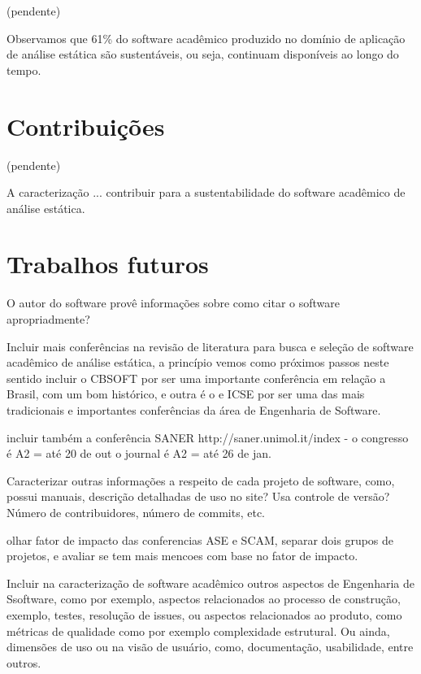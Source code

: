 \label{conclusoes}

(pendente)

Observamos que 61\% do software acadêmico produzido no domínio de aplicação de
análise estática são sustentáveis, ou seja, continuam disponíveis ao longo do
tempo.

\section{Contribuições}

(pendente)

A caracterização ... contribuir para a sustentabilidade do software acadêmico
de análise estática.

\section{Trabalhos futuros}

O autor do software provê informações sobre como citar o software apropriadmente? \cite{allen2017engineering}

Incluir mais conferências na revisão de literatura para busca e seleção de
software acadêmico de análise estática, a princípio vemos como próximos passos
neste sentido incluir o CBSOFT por ser uma importante conferência em relação a
Brasil, com um bom histórico, e outra é o e ICSE por ser uma das mais
tradicionais e importantes conferências da área de Engenharia de Software.

incluir também a conferência SANER http://saner.unimol.it/index -
 o congresso é A2 = até 20 de out
 o journal é A2 = até 26 de jan.

Caracterizar outras informações a respeito de cada projeto de software, como,
possui manuais, descrição detalhadas de uso no site? Usa controle de versão?
Número de contribuidores, número de commits, etc.

olhar fator de impacto das conferencias ASE e SCAM, separar dois grupos de
projetos, e avaliar se tem mais mencoes com base no fator de impacto.

Incluir na caracterização de software acadêmico outros aspectos de Engenharia
de Ssoftware, como por exemplo, aspectos relacionados ao processo de
construção, exemplo, testes, resolução de issues, ou aspectos relacionados ao
produto, como métricas de qualidade como por exemplo complexidade estrutural.
Ou ainda, dimensões de uso ou na visão de usuário, como, documentação,
usabilidade, entre outros.

